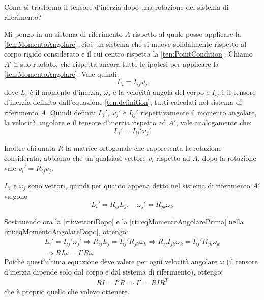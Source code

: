\documentclass[../main.tex]{subfiles}
\begin{document}
\label{ex:rti}

\textex
Come si trasforma il tensore d'inerzia dopo una rotazione del sistema di riferimento?

\solution
Mi pongo in un sistema di riferimento $A$ rispetto al quale posso applicare la \cref{ten:MomentoAngolare}, cioè un sistema che si muove solidalmente rispetto al corpo rigido considerato e il cui centro rispetta la \cref{ten:PointCondition}. Chiamo $A'$ il suo ruotato, che rispetta ancora tutte le ipotesi per applicare la \cref{ten:MomentoAngolare}. Vale quindi:
\begin{equation} \label{rti:eqMomentoAngolarePrima}
	L_i=I_{ij}\omega_j
\end{equation}
dove $L_i$ è il momento d'inerzia, $\omega_j$ è la velocità angola del corpo e $I_{ij}$ è il tensore d'inerzia definito dall'equazione \cref{ten:definition}, tutti calcolati nel sistema di riferimento $A$. Quindi definiti $L_i'$, $\omega_j'$ e $I_{ij}'$ rispettivamente il momento angolare, la velocità angolare e il tensore d'inerzia rispetto ad $A'$, vale analogamente che:
\begin{equation}\label{rti:eqMomentoAngolareDopo}
	L_i'=I_{ij}'\omega_j'
\end{equation}

Inoltre chiamata $R$ la matrice ortogonale che rappresenta la rotazione considerata, abbiamo che un qualsiasi vettore $v_i$ rispetto ad $A$, dopo la rotazione vale $v_i'=R_{ij}v_j$.

$L_i$ e $\omega_j$ sono vettori, quindi per quanto appena detto nel sistema di riferimento $A'$ valgono
\begin{equation}\label{rti:vettoriDopo}
	L_i'=R_{ij}L_j, \quad \omega_j'=R_{jk}\omega_k
\end{equation}

Sostituendo ora la \cref{rti:vettoriDopo} e la \cref{rti:eqMomentoAngolarePrima} nella \cref{rti:eqMomentoAngolareDopo}, ottengo:
\begin{gather*}
	L_i'=I_{ij}'\omega_j' \Longrightarrow R_{ij}L_j=I_{ij}'R_{jk}\omega_k \Longrightarrow R_{ij}I_{jk}\omega_k=I_{ij}'R_{jk}\omega_k \\
	\Longrightarrow RI\omega=I'R\omega
\end{gather*}
Poichè quest'ultima equazione deve valere per ogni velocità angolare $\omega$ (il tensore d'inerzia dipende solo dal corpo e dal sistema di riferimento), ottengo:
\begin{gather*}
	RI=I'R \Longrightarrow I'=RIR^{T}
\end{gather*}
che è proprio quello che volevo ottenere.
\end{document}
